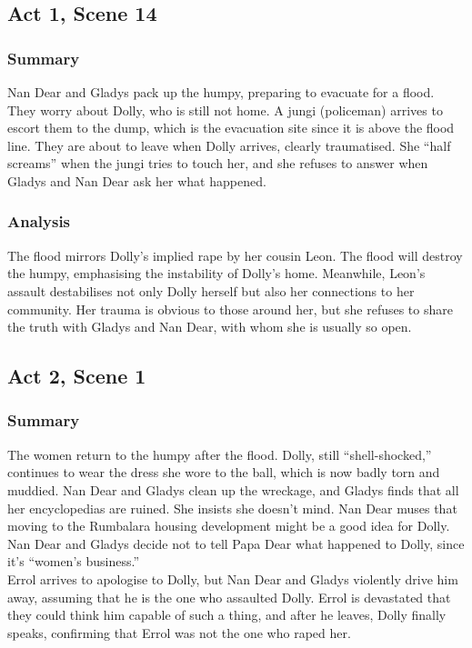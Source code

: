 \documentclass[a4paper]{article}
\begin{document}
\subsection{Act 1, Scene 14}
\subsubsection{Summary}
Nan Dear and Gladys pack up the humpy, preparing to
evacuate for a flood. They worry about Dolly, who is still not
home. A jungi (policeman) arrives to escort them to the dump,
which is the evacuation site since it is above the flood line. They
are about to leave when Dolly arrives, clearly traumatised. She
“half screams” when the jungi tries to touch her, and she
refuses to answer when Gladys and Nan Dear ask her what
happened.\\

\subsubsection{Analysis}
The flood mirrors Dolly’s implied rape by her cousin Leon. The flood
will destroy the humpy, emphasising the instability of Dolly’s home.
Meanwhile, Leon’s assault destabilises not only Dolly herself but
also her connections to her community. Her trauma is obvious to
those around her, but she refuses to share the truth with Gladys and
Nan Dear, with whom she is usually so open.\\

\subsection{Act 2, Scene 1}
\subsubsection{Summary}
The women return to the humpy after the flood. Dolly, still
“shell-shocked,” continues to wear the dress she wore to the
ball, which is now badly torn and muddied. Nan Dear and
Gladys clean up the wreckage, and Gladys finds that all her
encyclopedias are ruined. She insists she doesn’t mind. Nan
Dear muses that moving to the Rumbalara housing
development might be a good idea for Dolly. Nan Dear and
Gladys decide not to tell Papa Dear what happened to Dolly,
since it’s “women’s business.”\\

Errol arrives to apologise to Dolly, but Nan Dear and Gladys
violently drive him away, assuming that he is the one who
assaulted Dolly. Errol is devastated that they could think him
capable of such a thing, and after he leaves, Dolly finally speaks,
confirming that Errol was not the one who raped her.\\
\end{document}
